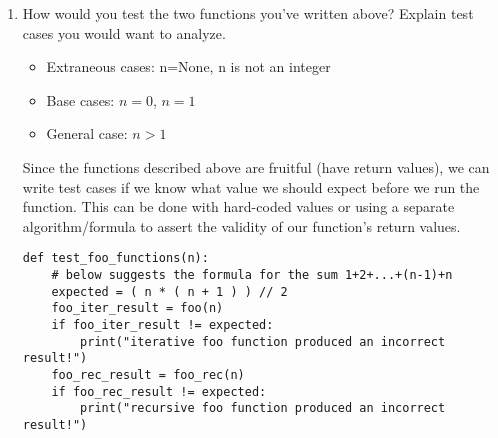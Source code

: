\begin{enumerate}
\item How would you test the two functions you've written above? Explain test cases you would want to analyze.

\begin{answer}
\begin{itemize}
\item Extraneous cases: n=None, n is not an integer
\item Base cases: $n=0$, $n=1$
\item General case: $n > 1$
\end{itemize}
Since the functions described above are fruitful (have return values), we can write test cases if we know what
value we should expect before we run the function. This can be done with hard-coded values or using a separate algorithm/formula
to assert the validity of our function's return values.\\
\begin{lstlisting}
def test_foo_functions(n):
	# below suggests the formula for the sum 1+2+...+(n-1)+n
	expected = ( n * ( n + 1 ) ) // 2
	foo_iter_result = foo(n)
	if foo_iter_result != expected:
		print("iterative foo function produced an incorrect result!")
	foo_rec_result = foo_rec(n)
	if foo_rec_result != expected:
		print("recursive foo function produced an incorrect result!")
\end{lstlisting}
\end{answer}

\end{enumerate}




